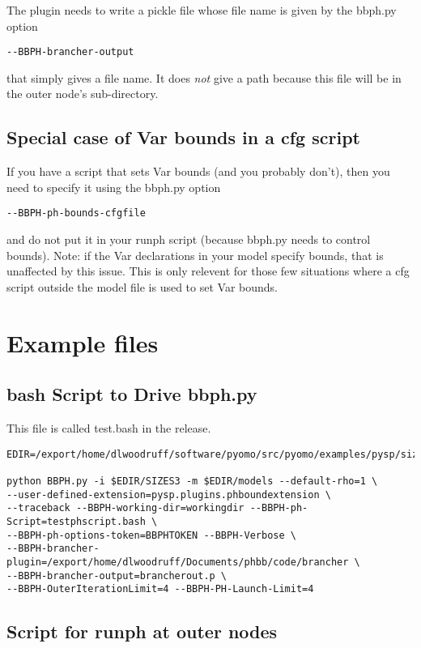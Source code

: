 \documentclass[12pt]{article}
\begin{document}
The plugin needs to write a pickle file whose file name
is given by the bbph.py option
\begin{verbatim}
--BBPH-brancher-output
\end{verbatim}
that simply gives a file name. It does {\em not} give
a path because this file will be in the
outer node's sub-directory.

\subsection{Special case of Var bounds in a cfg script}

If you have a script that sets Var bounds (and you probably don't), then you
need to specify it using the bbph.py option
\begin{verbatim}
--BBPH-ph-bounds-cfgfile
\end{verbatim}
and do not put it in your runph script (because bbph.py needs
to control bounds). Note: if the Var declarations in your
model specify bounds, that is unaffected by this issue. This
is only relevent for those few situations where a cfg script
outside the model file is used to set Var bounds.

\section{Example files}

\subsection{bash Script to Drive bbph.py}

This file is called test.bash in the release.

\begin{verbatim}
EDIR=/export/home/dlwoodruff/software/pyomo/src/pyomo/examples/pysp/sizes

python BBPH.py -i $EDIR/SIZES3 -m $EDIR/models --default-rho=1 \
--user-defined-extension=pysp.plugins.phboundextension \
--traceback --BBPH-working-dir=workingdir --BBPH-ph-Script=testphscript.bash \
--BBPH-ph-options-token=BBPHTOKEN --BBPH-Verbose \
--BBPH-brancher-plugin=/export/home/dlwoodruff/Documents/phbb/code/brancher \
--BBPH-brancher-output=brancherout.p \
--BBPH-OuterIterationLimit=4 --BBPH-PH-Launch-Limit=4
\end{verbatim}

\subsection{Script for runph at outer nodes}
\end{document}
